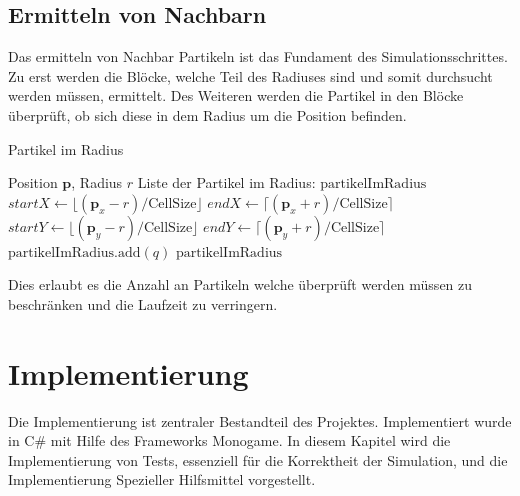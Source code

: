 \documentclass[a4paper, 12pt]{article}
\begin{document}
\subsection{Ermitteln von Nachbarn}
Das ermitteln von Nachbar Partikeln ist das Fundament des Simulationsschrittes. Zu erst werden die Blöcke, welche Teil des Radiuses sind und somit durchsucht werden müssen, ermittelt. Des Weiteren werden die Partikel in den Blöcke überprüft, ob sich diese in dem Radius um die Position befinden.
\begin{algorithm}[H]
    \caption{Partikel im Radius}
    \begin{algorithmic}[1]
		\Require Position $\mathbf{p}$, Radius $r$
        \Ensure Liste der Partikel im Radius: $\text{partikelImRadius}$
        \State $startX \leftarrow \lfloor (\mathbf{p}_x - r) / \text{CellSize} \rfloor$
        \State $endX \leftarrow \lceil (\mathbf{p}_x + r) / \text{CellSize} \rceil$
        \State $startY \leftarrow \lfloor (\mathbf{p}_y - r) / \text{CellSize} \rfloor$
        \State $endY \leftarrow \lceil (\mathbf{p}_y + r) / \text{CellSize} \rceil$
                            \State $\text{partikelImRadius}.\text{add}(q)$
                        \EndIf
                    \EndFor
                \EndIf
            \EndFor
        \EndFor
        \Return $\text{partikelImRadius}$
    \end{algorithmic}
\end{algorithm}
Dies erlaubt es die Anzahl an Partikeln welche überprüft werden müssen zu beschränken und die Laufzeit zu verringern. 

\section{Implementierung} \label{Kap:Implementierung}
Die Implementierung ist zentraler Bestandteil des Projektes. Implementiert wurde in C\# mit Hilfe des Frameworks Monogame. In diesem Kapitel wird die Implementierung von Tests, essenziell für die Korrektheit der Simulation, und die Implementierung Spezieller Hilfsmittel vorgestellt. 
\end{document}
